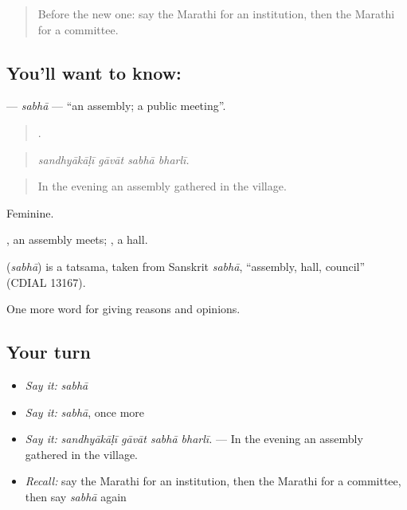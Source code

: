 \label{lesson:MR-C364-sabha}



\begin{quote}
Before the new one: say the Marathi for an institution, then the Marathi for a committee.
\end{quote}

\subsection*{You'll want to know: }
\textbf{} — \emph{sabhā} — \textquotedblleft{}an assembly; a public meeting\textquotedblright{}.

\begin{quote}
   .
\end{quote}

\begin{quote}
\emph{sandhyākāḷī gāvāt sabhā bharlī.}
\end{quote}

\begin{quote}
In the evening an assembly gathered in the village.
\end{quote}

Feminine.

 , an assembly meets; , a hall.

\begin{cousinweb}
\textbf{} (\emph{sabhā}) is a tatsama, taken from Sanskrit \emph{sabhā}, \textquotedblleft{}assembly, hall, council\textquotedblright{} (CDIAL 13167).
\end{cousinweb}

\begin{grammarlens}[title={What you've built}]
One more word for giving reasons and opinions.
\end{grammarlens}

\subsection*{Your turn}
\begin{itemize}
\raggedright
  \item \emph{Say it:} \emph{sabhā}
  \item \emph{Say it:} \emph{sabhā}, once more
  \item \emph{Say it:} \emph{sandhyākāḷī gāvāt sabhā bharlī.} — In the evening an assembly gathered in the village.
  \item \emph{Recall:} say the Marathi for an institution, then the Marathi for a committee, then say \emph{sabhā} again
\end{itemize}

